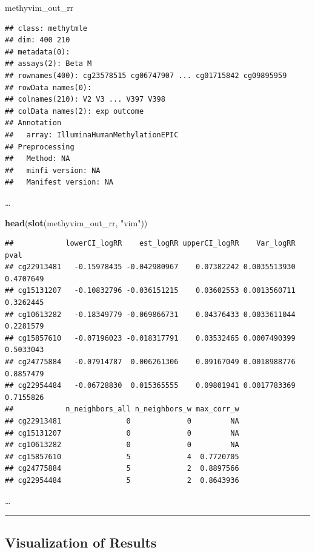 \documentclass[9pt,a4paper,]{extarticle}
\newenvironment{Shaded}{\begin{snugshade}}{\end{snugshade}}
\newcommand{\KeywordTok}[1]{\textcolor[rgb]{0.13,0.29,0.53}{\textbf{#1}}}
\newcommand{\StringTok}[1]{\textcolor[rgb]{0.31,0.60,0.02}{#1}}
\newcommand{\NormalTok}[1]{#1}
\theoremstyle{definition}
\theoremstyle{definition}
\theoremstyle{definition}
\theoremstyle{remark}
\begin{document}
\begin{Shaded}
\begin{Highlighting}[]
\NormalTok{methyvim_out_rr}
\end{Highlighting}
\end{Shaded}

\begin{verbatim}
## class: methytmle 
## dim: 400 210 
## metadata(0):
## assays(2): Beta M
## rownames(400): cg23578515 cg06747907 ... cg01715842 cg09895959
## rowData names(0):
## colnames(210): V2 V3 ... V397 V398
## colData names(2): exp outcome
## Annotation
##   array: IlluminaHumanMethylationEPIC
## Preprocessing
##   Method: NA
##   minfi version: NA
##   Manifest version: NA
\end{verbatim}

\ldots{}

\begin{Shaded}
\begin{Highlighting}[]
\KeywordTok{head}\NormalTok{(}\KeywordTok{slot}\NormalTok{(methyvim_out_rr, }\StringTok{"vim"}\NormalTok{))}
\end{Highlighting}
\end{Shaded}

\begin{verbatim}
##            lowerCI_logRR    est_logRR upperCI_logRR    Var_logRR      pval
## cg22913481   -0.15978435 -0.042980967    0.07382242 0.0035513930 0.4707649
## cg15131207   -0.10832796 -0.036151215    0.03602553 0.0013560711 0.3262445
## cg10613282   -0.18349779 -0.069866731    0.04376433 0.0033611044 0.2281579
## cg15857610   -0.07196023 -0.018317791    0.03532465 0.0007490399 0.5033043
## cg24775884   -0.07914787  0.006261306    0.09167049 0.0018988776 0.8857479
## cg22954484   -0.06728830  0.015365555    0.09801941 0.0017783369 0.7155826
##            n_neighbors_all n_neighbors_w max_corr_w
## cg22913481               0             0         NA
## cg15131207               0             0         NA
## cg10613282               0             0         NA
## cg15857610               5             4  0.7720705
## cg24775884               5             2  0.8897566
## cg22954484               5             2  0.8643936
\end{verbatim}

\ldots{}

\begin{center}\rule{0.5\linewidth}{\linethickness}\end{center}

\subsection{Visualization of Results}\label{visualization-of-results}
\end{document}
